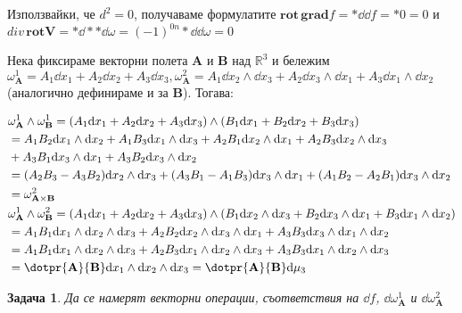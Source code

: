 \documentclass[12pt]{article}
\newtheorem{problem}{Задача}
\begin{document}
\begin{large}
Използвайки, че $d^2=0$, получаваме формулатите $\mathbf{rot} \, \mathbf{grad}f=\ast \dd \dd f = \ast 0 = 0$ и $div \, \mathbf{rot} \mathbf{V}=\ast \dd \ast \ast \dd \omega = (-1)^{0n}\ast \dd \dd \omega = 0$

Нека фиксираме векторни полета $\mathbf{A}$ и $\mathbf{B}$ над $\mathbb{R}^3$ и бележим $\omega_{\mathbf{A}}^1=A_1 \dd x_1 + A_2 \dd x_2 + A_3 \dd x_3, \omega_{\mathbf{A}}^2=A_1 \dd x_2 \wedge \dd x_3 + A_2 \dd x_3 \wedge \dd x_1 + A_3 \dd x_1 \wedge \dd x_2$(аналогично дефинираме и за $\mathbf{B}$). Тогава:

\begin{align*}
&\omega_{\mathbf{A}}^1 \wedge \omega_{\mathbf{B}}^1 = (A_1 \dd x_1 + A_2 \dd x_2 + A_3 \dd x_3) \wedge (B_1 \dd x_1 + B_2 \dd x_2 + B_3 \dd x_3) \\
&= A_1 B_2 \dd x_1 \wedge \dd x_2 + A_1 B_3 \dd x_1 \wedge \dd x_3 + A_2 B_1 \dd x_2 \wedge \dd x_1 + A_2 B_3 \dd x_2 \wedge \dd x_3 \\
&+ A_3 B_1 \dd x_3 \wedge \dd x_1 + A_3 B_2 \dd x_3 \wedge \dd x_2 \\
&=(A_2 B_3 - A_3 B_2)\dd x_2 \wedge \dd x_3 + (A_3 B_1 - A_1 B_3)\dd x_3 \wedge \dd x_1 + (A_1 B_2 - A_2 B_1)\dd x_3 \wedge \dd x_2 \\
&= \omega_{\mathbf{A} \times \mathbf{B}}^2 \\
&\omega_{\mathbf{A}}^1 \wedge \omega_{\mathbf{B}}^2 = (A_1 \dd x_1 + A_2 \dd x_2 + A_3 \dd x_3) \wedge (B_1 \dd x_2 \wedge \dd x_3 + B_2 \dd x_3 \wedge \dd x_1 + B_3 \dd x_1 \wedge \dd x_2) \\
&= A_1 B_1 \dd x_1 \wedge \dd x_2 \wedge \dd x_3  +  A_2 B_2 \dd x_2 \wedge \dd x_3 \wedge \dd x_1  + A_3 B_3 \dd x_3 \wedge \dd x_1 \wedge \dd x_2 \\
&=A_1 B_1 \dd x_1 \wedge \dd x_2 \wedge \dd x_3 + A_2 B_3 \dd x_1 \wedge \dd x_2 \wedge \dd x_3 + A_3 B_3 \dd x_1 \wedge \dd x_2 \wedge \dd x_3 \\
&=\dotpr{\mathbf{A}}{\mathbf{B}} \dd x_1 \wedge \dd x_2 \wedge \dd x_3 = \dotpr{\mathbf{A}}{\mathbf{B}} \dd \mu_3
\end{align*}

\begin{problem}
Да се намерят векторни операции, съответствия на $\dd f$, $\dd \omega_{\mathbf{A}}^1$ и $\dd \omega_{\mathbf{A}}^2$ 
\end{problem}


\end{large}
\end{document}

